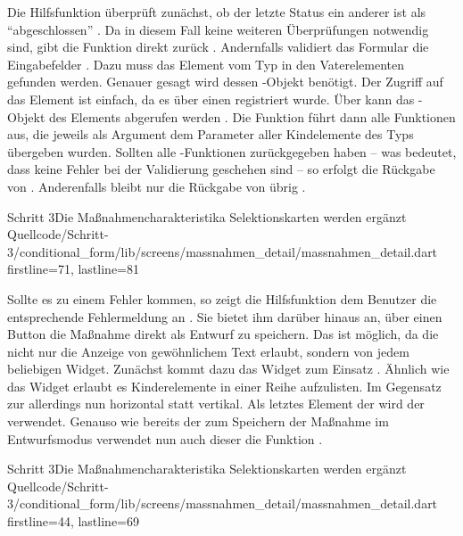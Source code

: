 Die Hilfsfunktion  überprüft zunächst, ob der letzte Status ein anderer ist als \enquote{abgeschlossen} . Da in diesem Fall keine weiteren Überprüfungen notwendig sind, gibt die Funktion direkt  zurück .
Andernfalls validiert das Formular die Eingabefelder . Dazu muss das Element vom Typ  in den Vaterelementen gefunden werden. Genauer gesagt wird dessen -Objekt benötigt. Der Zugriff auf das Element ist einfach, da es über einen  registriert wurde. Über  kann das -Objekt des Elements abgerufen werden . Die Funktion  führt dann alle Funktionen aus, die jeweils als Argument dem Parameter  aller Kindelemente des Typs  übergeben wurden. Sollten alle -Funktionen  zurückgegeben haben -- was bedeutet, dass keine Fehler bei der Validierung geschehen sind -- so erfolgt die Rückgabe von  . Anderenfalls bleibt nur die Rückgabe von  übrig .

\begin{alexlisting}{Schritt 3}{Die Maßnahmencharakteristika Selektionskarten werden ergänzt}
    {Quellcode/Schritt-3/conditional_form/lib/screens/massnahmen_detail/massnahmen_detail.dart}
    {firstline=71, lastline=81}
    \label{lst:Schritt3inputsAreValidOrNotMarkedFinal}
\end{alexlisting}

Sollte es zu einem Fehler kommen, so zeigt die Hilfsfunktion  dem Benutzer die entsprechende Fehlermeldung an \Lst{\ref{lst:Schritt3showValidationError}}. Sie bietet ihm darüber hinaus an, über einen Button die Maßnahme direkt als Entwurf zu speichern. Das ist möglich, da die   nicht nur die Anzeige von gewöhnlichem Text erlaubt, sondern von jedem beliebigen Widget. Zunächst kommt dazu das Widget  zum Einsatz . Ähnlich wie das Widget  erlaubt es Kinderelemente in einer Reihe aufzulisten. Im Gegensatz zur  allerdings nun horizontal statt vertikal. Als letztes Element der  wird der   verwendet. Genauso wie bereits der  zum Speichern der Maßnahme im Entwurfsmodus verwendet nun auch dieser  die Funktion  .

\begin{alexlisting}{Schritt 3}{Die Maßnahmencharakteristika Selektionskarten werden ergänzt}
    {Quellcode/Schritt-3/conditional_form/lib/screens/massnahmen_detail/massnahmen_detail.dart}
    {firstline=44, lastline=69}
    \label{lst:Schritt3showValidationError}
\end{alexlisting}
